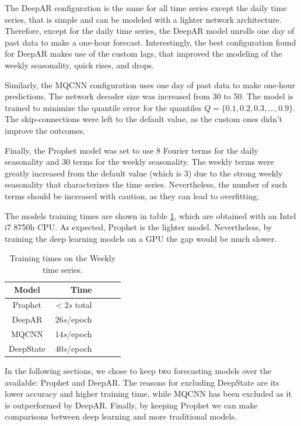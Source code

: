 \documentclass[a4paper, 12pt]{article} %
\newcommand{\ra}[1]{\renewcommand{\arraystretch}{#1}}
\begin{document}
	The DeepAR configuration is the same for all time series except the daily time series, that is simple and can be modeled with a lighter network architecture. Therefore, except for the daily time series, the DeepAR model unrolls one day of past data to make a one-hour forecast. Interestingly, the best configuration found for DeepAR makes use of the custom lags, that improved the modeling of the weekly seasonality, quick rises, and drops. 
	
	Similarly, the MQCNN configuration uses one day of past data to make one-hour predictions. The network decoder size was increased from 30 to 50. The model is trained to minimize the quantile error for the quantiles $Q = \{ 0.1, 0.2, 0.3, ..., 0.9\}$. The skip-connections were left to the default value, as the custom ones didn't improve the outcomes.
	
	Finally, the Prophet model was set to use 8 Fourier terms for the daily seasonality and 30 terms for the weekly seasonality. The weekly terms were greatly increased from the default value (which is 3) due to the strong weekly seasonality that characterizes the time series. Nevertheless, the number of such terms should be increased with caution, as they can lead to overfitting.
	
	The models training times are shown in table \ref{table:results_forecasting_training_times}, which are obtained with an Intel i7 8750h CPU. As expected, Prophet is the lighter model. Nevertheless, by training the deep learning models on a GPU the gap would be much slower.
	
	\begin{table}\centering 
		\ra{1.3}
	\begin{tabular}{@{}crcrc@{}} 
		\midrule
		Model & Time\\
		\midrule
		Prophet & $<2s$ total\\
		DeepAR & $26s$/epoch\\
		MQCNN & $14s$/epoch\\
		DeepState & $40s$/epoch\\
		\bottomrule
	\end{tabular}
	\caption{Training times on the Weekly time series. } \label{table:results_forecasting_training_times}
\end{table}
	
	
	In the following sections, we chose to keep two forecasting models over the available: Prophet and DeepAR. The reasons for excluding DeepState are its lower accuracy and higher training time, while MQCNN has been excluded as it is outperformed by DeepAR. Finally, by keeping Prophet we can make comparisons between deep learning and more traditional models.	
	
\end{document}

